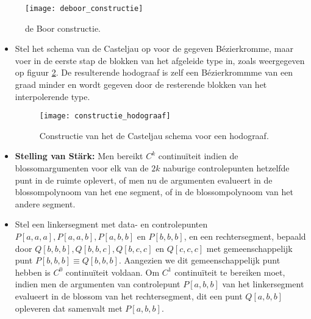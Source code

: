 \begin{itemize}
{\begin{itemize}
			\begin{figure}[ht]
				\centering
				\texttt{[image: deboor\_constructie]}
				\caption{de Boor constructie.}
				\label{fig:deboor_constructie}
			\end{figure}
		\end{itemize}
		}
	{
		\begin{itemize}
			\item Stel het schema van de Casteljau op voor de gegeven Bézierkromme, maar voer in de eerste stap de blokken van het afgeleide type in, zoals weergegeven op figuur \ref{fig:constructie_hodograaf}. De resulterende hodograaf is zelf een Bézierkrommme van een graad minder en wordt gegeven door de resterende blokken van het interpolerende type.
			\begin{figure}[ht]
				\centering
				\texttt{[image: constructie\_hodograaf]}	
				\caption{Constructie van het de Casteljau schema voor een hodograaf.}
				\label{fig:constructie_hodograaf}
			\end{figure}
		\end{itemize}
		
	}
	{
		\begin{itemize} 
		\item \textbf{Stelling van Stärk:} Men bereikt $C^k$ continuïteit indien de blossomargumenten voor elk van de $2k$ naburige controlepunten hetzelfde punt in de ruimte oplevert, of men nu de argumenten evalueert in de blossompolynoom van het ene segment, of in de blossompolynoom van het andere segment. 
		\item Stel een linkersegment met data- en controlepunten $P[a, a, a], P[a, a, b], P[a, b, b]$ en $P[b, b, b]$, en een rechtersegment, bepaald door $Q[b, b, b], Q[b, b, c], Q[b, c, c]$ en $Q[c, c, c]$ met gemeenschappelijk punt $P[b, b, b] \equiv Q[b, b, b]$. Aangezien we dit gemeenschappelijk punt hebben is $C^0$ continuïteit voldaan. Om $C^1$ continuïteit te bereiken moet, indien men de argumenten van controlepunt $P[a, b, b]$ van het linkersegment evalueert in de blossom van het rechtersegment, dit een punt $Q[a, b, b]$ opleveren dat samenvalt met $P[a, b, b]$.
			

\end{itemize}}
\end{itemize}
